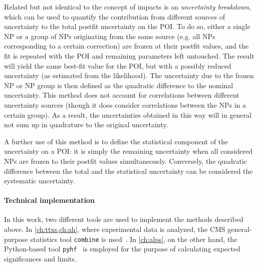 Related but not identical to the concept of impacts is an \textit{uncertainty breakdown}, which can be used to quantify the contribution from different sources of uncertainty to the total postfit uncertainty on the POI. To do so, either a single NP or a group of NPs originating from the same source (e.g. all NPs corresponding to a certain correction) are frozen at their postfit values, and the fit is repeated with the POI and remaining parameters left untouched. The result will yield the same best-fit value for the POI, but with a possibly reduced uncertainty (as estimated from the likelihood). The uncertainty due to the frozen NP or NP group is then defined as the quadratic difference to the nominal uncertainty.
This method does not account for correlations between different uncertainty sources (though it does consider correlations between the NPs in a certain group). As a result, the uncertainties obtained in this way will in general not sum up in quadrature to the original uncertainty. 

A further use of this method is to define the statistical component of the uncertainty on a POI: it is simply the remaining uncertainty when all considered NPs are frozen to their postfit values simultaneously. Conversely, the quadratic difference between the total and the statistical uncertainty can be considered the systematic uncertainty.

\paragraph{Technical implementation}
In this work, two different tools are used to implement the methods described above. In \cref{ch:ttxs,ch:ah}, where experimental data is analyzed, the CMS general-purpose statistics tool \texttt{combine} is used~\cite{CMS:CAT-23-001}. In \cref{ch:alps}, on the other hand, the Python-based tool \texttt{pyhf}~\cite{pyhf_joss} is employed for the purpose of calculating expected significances and limits.



